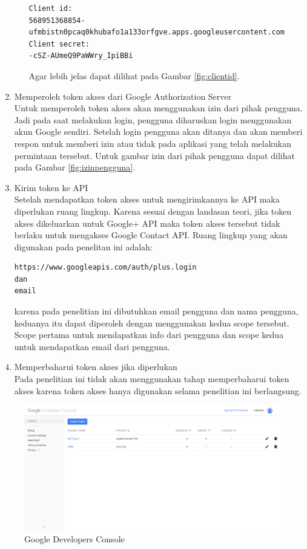 \begin{enumerate}[(1)]
\begin{enumerate}
\begin{lstlisting}[basicstyle=\footnotesize]
Client id:
568951368854-ufmbistn0pcaq0khubafo1a133orfgve.apps.googleusercontent.com
Client secret:
-cSZ-AUmeQ9PaWWry_IpiBBi
\end{lstlisting}
Agar lebih jelas dapat dilihat pada Gambar \ref{fig:clientid}.
    \end{enumerate}
\item Memperoleh token akses dari Google Authorization Server\\
Untuk memperoleh token akses akan menggunakan izin dari pihak pengguna. Jadi
pada saat melakukan login, pengguna diharuskan login menggunakan akun Google
sendiri. Setelah login pengguna akan ditanya dan akan memberi respon untuk
memberi izin atau tidak pada aplikasi yang telah melakukan permintaan tersebut.
Untuk gambar izin dari pihak pengguna dapat dilihat pada Gambar
\ref{fig:izinpengguna}.
\item Kirim token ke API\\
Setelah mendapatkan token akses untuk mengirimkannya ke API maka diperlukan
ruang lingkup. Karena sesuai dengan landasan teori, jika token akses dikeluarkan
untuk Google+ API maka token akses tersebut tidak berlaku untuk mengakses Google
Contact API. Ruang lingkup yang akan digunakan pada penelitan ini adalah:
\begin{lstlisting}[basicstyle=\footnotesize]
https://www.googleapis.com/auth/plus.login
dan
email
\end{lstlisting}
karena pada penelitian ini dibutuhkan email pengguna dan nama pengguna, keduanya
itu dapat diperoleh dengan menggunakan kedua scope tersebut. Scope pertama untuk
mendapatkan info dari pengguna dan scope kedua untuk mendapatkan email dari
pengguna.
\item Memperbaharui token akses jika diperlukan\\
Pada penelitian ini tidak akan menggunakan tahap memperbaharui token akses
karena token akses hanya digunakan selama penelitian ini berlangsung.
\end{enumerate}

\begin{figure}[p]
\centering
\includegraphics[scale=0.4]{Gambar/GDC.png}
\caption[Google Developers Console]{Google Developers Console} 
\label{fig:gdc}
\end{figure}

